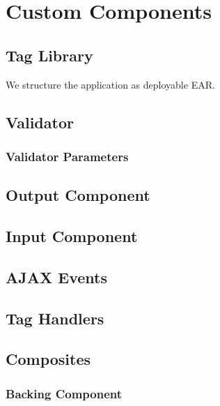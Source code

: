%

\chapter{Custom Components}

\section{Tag Library}

We structure the application as deployable EAR.

\section{Validator}

\subsection{Validator Parameters}

\section{Output Component}

\section{Input Component}

\section{AJAX Events}

\section{Tag Handlers}

\section{Composites}

\subsection{Backing Component}